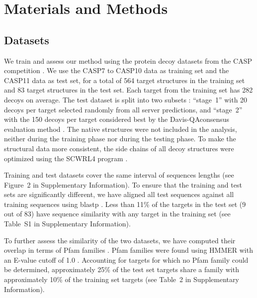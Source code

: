 \documentclass{bioinfo}
\begin{document}
\section{Materials and Methods}

\subsection{Datasets}

We train and assess our method using the protein decoy datasets from
the CASP competition \citep{moult2014critical}.  We use the CASP7 to
CASP10 data as training set and the CASP11 data as test set, for a
total of 564 target structures in the training set and 83 target
structures in the test set. Each target from the training set has 282
decoys on average.
The test dataset is split into two subsets \citep{kryshtafovych2015}:
``stage~1'' with 20 decoys per target selected randomly from all
server predictions, and ``stage~2'' with the 150 decoys per target
considered best by the Davis-QAconsensus evaluation
method \citep{kryshtafovych2015}.
The native structures were not included in the analysis, neither
during the training phase nor during the testing phase. To make the
structural data more consistent, the side chains of all decoy
structures were optimized using the SCWRL4 program
\citep{krivov2009improved}.

Training and test datasets cover the same interval of sequences
lengths (see Figure~2\vphantom{S1} in Supplementary Information). To ensure that the
training and test sets are significantly different, we have aligned
all test sequences against all training sequences using
blastp \citep{altschul1990basic}.  Less than 11\% of the targets in the
test set (9 out of 83) have sequence similarity with any target in the
training set (see Table~S1 in Supplementary Information).

To further assess the similarity of the two datasets, we have computed
their overlap in terms of Pfam families \citep{finn2016pfam}. Pfam
families were found using HMMER \citep{finn2015hmmer} with an E-value
cutoff of 1.0 \citep{finn2016pfam}.  Accounting for targets for which
no Pfam family could be determined, approximately 25\% of the test set
targets share a family with approximately 10\% of the training set
targets (see Table~2\vphantom{S2} in Supplementary Information).
\end{document}
